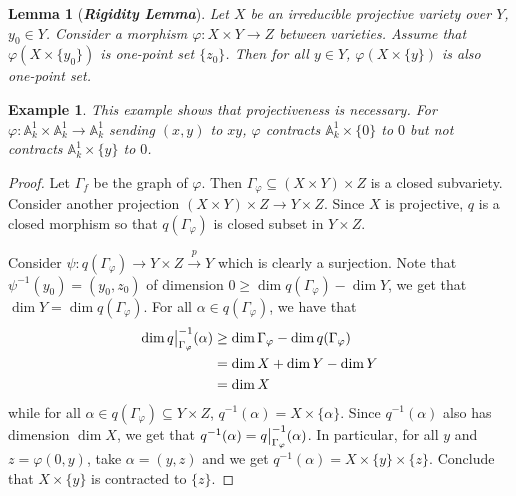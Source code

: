 \documentclass{ctexart}
\newtheorem{lemma}{Lemma}[section]
\newtheorem{example}{Example}[section]
\begin{document}
\begin{lemma}[\textbf{\emph{Rigidity Lemma}}]
    Let $X$ be an irreducible projective variety over $Y$, $y_{0}\in Y$.
    Consider a morphism $\varphi: X \times Y \rightarrow Z$ between varieties.
    Assume that $\varphi(X \times \{y_{0}\})$ is one-point set $\{z_{0}\}$.
    Then for all $y\in Y$, $\varphi(X \times \{y\})$ is also one-point set.
    \label{Lemma 4.3} 
\end{lemma}
\begin{example}
    This example shows that projectiveness is necessary.
    For $\varphi: \mathbb{A}_{k}^{1} \times \mathbb{A}_{k}^{1} \rightarrow \mathbb{A}_{k}^{1}$ sending $(x, y)$ to $xy$,
    $\varphi$ contracts $\mathbb{A}_{k}^{1} \times \{0\}$ to $0$ but not contracts $\mathbb{A}_{k}^{1} \times \{y\}$ to $0$.
\end{example}
\begin{proof}
    Let $\Gamma_{f}$ be the graph of $\varphi$.
    Then $\Gamma_{\varphi} \subseteq (X \times Y) \times Z$ is a closed subvariety.
    Consider another projection $(X \times Y) \times Z \rightarrow Y \times Z$.
    Since $X$ is projective, $q$ is a closed morphism so that $q(\Gamma_{\varphi})$ is closed subset in $Y \times Z$.
    \par
    Consider $\psi: q(\Gamma_{\varphi}) \rightarrow Y \times Z \overset{p}{\rightarrow} Y$ which is clearly a surjection.
    Note that $\psi^{-1}(y_{0}) = (y_{0}, z_{0})$ of dimension $0 \ge \dim q(\Gamma_{\varphi}) - \dim Y$, we get that $\dim Y = \dim q(\Gamma_{\varphi})$.
    For all $\alpha\in q(\Gamma_{\varphi})$, we have that
    \begin{equation}
        \begin{split}
            \dim q\big{|}_{\Gamma_{\varphi}}^{-1}(\alpha) & \ge \dim \Gamma_{\varphi} - \dim q(\Gamma_{\varphi}) \\
            & = \dim X + \dim Y - \dim Y \\
            & = \dim X
        \end{split}
    \end{equation}
    while for all $\alpha\in q(\Gamma_{\varphi}) \subseteq Y \times Z$, $q^{-1}(\alpha) = X \times \{\alpha\}$.
    Since $q^{-1}(\alpha)$ also has dimension $\dim X$,
    we get that $q^{-1}(\alpha) = q\big{|}_{\Gamma_{\varphi}}^{-1}(\alpha)$.
    In particular, for all $y$ and $z = \varphi(0, y)$, take $\alpha = (y, z)$ and we get $q^{-1}(\alpha) = X \times \{y\} \times \{z\}$.
    Conclude that $X \times \{y\}$ is contracted to $\{z\}$.
\end{proof}
\end{document}
